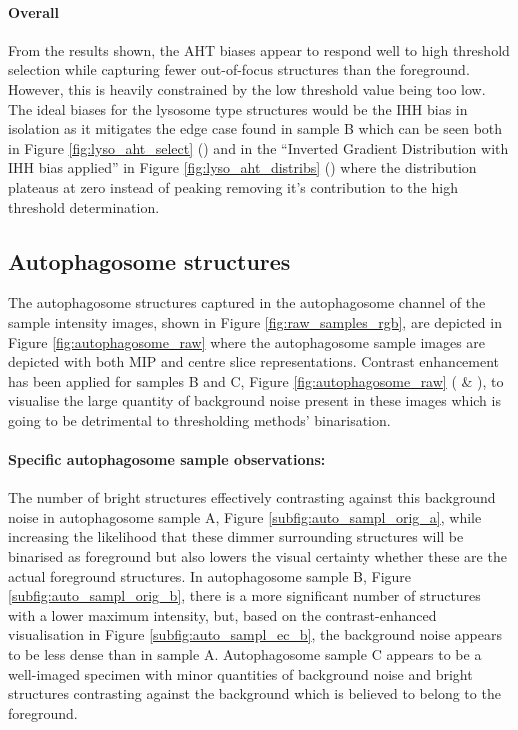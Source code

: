 \paragraph{Overall}
From the results shown, the AHT biases appear to respond well to high threshold selection while capturing fewer out-of-focus structures than the foreground. However, this is heavily constrained by the low threshold value being too low. The ideal biases for the lysosome type structures would be the IHH bias in isolation as it mitigates the edge case found in sample B which can be seen both in Figure \ref{fig:lyso_aht_select} () and in the ``Inverted Gradient Distribution with IHH bias applied'' in Figure \ref{fig:lyso_aht_distribs} () where the distribution plateaus at zero instead of peaking removing it's contribution to the high threshold determination.




\FloatBarrier

\subsection{Autophagosome structures}
The autophagosome structures captured in the autophagosome channel of the sample intensity images, shown in Figure \ref{fig:raw_samples_rgb}, are depicted in Figure \ref{fig:autophagosome_raw} where the autophagosome sample images are depicted with both MIP and centre slice representations. Contrast enhancement has been applied for samples B and C, Figure \ref{fig:autophagosome_raw} ( \& ), to visualise the large quantity of background noise present in these images which is going to be detrimental to thresholding methods' binarisation. \paragraph{Specific autophagosome sample observations:} The number of bright structures effectively contrasting against this background noise in autophagosome sample A, Figure \ref{subfig:auto_sampl_orig_a}, while increasing the likelihood that these dimmer surrounding structures will be binarised as foreground but also lowers the visual certainty whether these are the actual foreground structures. In autophagosome sample B, Figure \ref{subfig:auto_sampl_orig_b}, there is a more significant number of structures with a lower maximum intensity, but, based on the contrast-enhanced visualisation in Figure \ref{subfig:auto_sampl_ec_b}, the background noise appears to be less dense than in sample A. Autophagosome sample C appears to be a well-imaged specimen with minor quantities of background noise and bright structures contrasting against the background which is believed to belong to the foreground.

